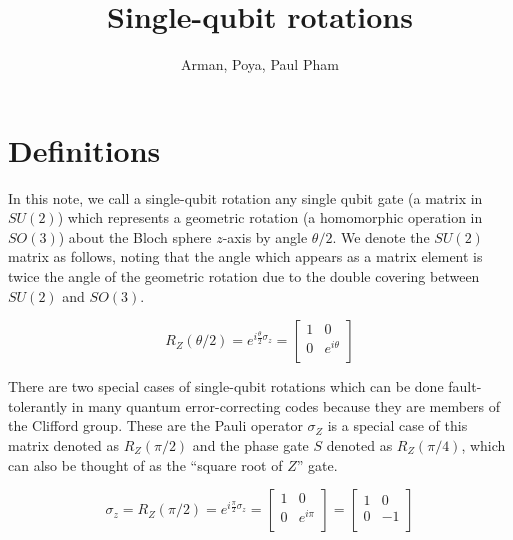 \documentclass[twocolumn,10pt]{article}
\title{Single-qubit rotations}
\author{Arman, Poya, Paul Pham}
\theoremstyle{plain}
\begin{document}
\newcommand{\braket}[2]{\langle #1|#2 \rangle}
\newcommand{\normtwo}{\frac{1}{\sqrt{2}}}
\newcommand{\norm}[1]{\parallel #1 \parallel}

\maketitle

\section{Definitions}

In this note, we call a single-qubit rotation
any single qubit gate (a matrix in $SU(2)$) which
represents a geometric rotation (a homomorphic operation in $SO(3)$)
about the Bloch sphere $z$-axis by angle $\theta/2$. We denote the
$SU(2)$ matrix as follows, noting that the angle which appears as a matrix
element is twice the angle of the geometric rotation due to the
double covering between $SU(2)$ and $SO(3)$.

\begin{equation}
R_Z(\theta / 2) = e^{i\frac{\theta}{2}\sigma_z} = 
 \left[
  \begin{array}{cc}
    1 & 0 \\
    0 & e^{i\theta} \\
  \end{array} \right]
\end{equation}

There are two special cases of single-qubit rotations which can be done
fault-tolerantly in many quantum error-correcting codes because they are
members of the Clifford group. These are 
the Pauli operator $\sigma_Z$ is a special case of this matrix denoted
as $R_Z(\pi/2)$ and the phase gate $S$ denoted as $R_Z(\pi/4)$, which can
also be thought of as the ``square root of $Z$'' gate.

\begin{equation}
\sigma_z = R_Z(\pi / 2) = e^{i\frac{\pi}{2}\sigma_z} = 
 \left[
  \begin{array}{cc}
    1 & 0 \\
    0 & e^{i \pi} \\
  \end{array} \right]
=
 \left[
  \begin{array}{cc}
    1 & 0 \\
    0 & -1 \\
  \end{array} \right]
\end{equation}
\end{document}
